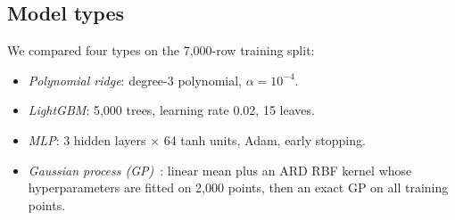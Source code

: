 ﻿\documentclass[conference,10pt]{IEEEtran}
\begin{document}
\subsection{Model types}
We compared four types on the 7,000-row training split:
\begin{itemize}
\item \emph{Polynomial ridge}: degree-3 polynomial, $\alpha=10^{-4}$.
\item \emph{LightGBM}: 5,000 trees, learning rate 0.02, 15 leaves.
\item \emph{MLP}: 3 hidden layers $\times$ 64 tanh units, Adam, early stopping.
\item \emph{Gaussian process (GP)}~\cite{gp}: linear mean plus an ARD RBF kernel whose hyperparameters are
fitted on 2,000 points, then an exact GP on all training points.
\end{itemize}
\end{document}
